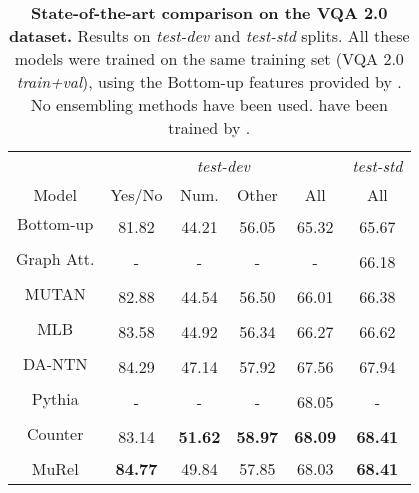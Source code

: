 \documentclass[10pt,twocolumn,letterpaper]{article}
\begin{document}
\begin{table}
    \centering
    \begin{tabular}{*5{c}c}
        \toprule
        & \multicolumn{4}{c}{\textit{test-dev}} & \textit{test-std}\\
        Model & Yes/No & Num. & Other & All & All  \\
        \midrule
        Bottom-up & \multirow{2}{*}{81.82} & \multirow{2}{*}{44.21} & \multirow{2}{*}{56.05} & \multirow{2}{*}{65.32} & \multirow{2}{*}{65.67} \\
        \cite{Anderson_2018_CVPR} \\
        Graph Att. & \multirow{2}{*}{-} & \multirow{2}{*}{-} & \multirow{2}{*}{-} & \multirow{2}{*}{-} & \multirow{2}{*}{66.18}\\
        \cite{learningconditionedgraph}\\
        MUTAN & \multirow{2}{*}{82.88} & \multirow{2}{*}{44.54} & \multirow{2}{*}{56.50} & \multirow{2}{*}{66.01} & \multirow{2}{*}{66.38}\\
         \cite{benyounescadene2017mutan}  \\
        MLB & \multirow{2}{*}{83.58} & \multirow{2}{*}{44.92} & \multirow{2}{*}{56.34} & \multirow{2}{*}{66.27} & \multirow{2}{*}{66.62}\\
        \cite{Kim2017} \\
        DA-NTN & \multirow{2}{*}{84.29} & \multirow{2}{*}{47.14} & \multirow{2}{*}{57.92} & \multirow{2}{*}{67.56} & \multirow{2}{*}{67.94}\\
        \cite{Bai_2018_ECCV} \\
        Pythia & \multirow{2}{*}{-} & \multirow{2}{*}{-} & \multirow{2}{*}{-} &  \multirow{2}{*}{68.05} & \multirow{2}{*}{-} \\
        \cite{pythia18arxiv}\\
        Counter & \multirow{2}{*}{83.14} & \multirow{2}{*}{\textbf{51.62}} & \multirow{2}{*}{\textbf{58.97}} & \multirow{2}{*}{\textbf{68.09}} & \multirow{2}{*}{\textbf{68.41}}\\
         \cite{zhang2018learning} \\
        \midrule
        MuRel & \textbf{84.77} & 49.84 & 57.85 & 68.03 & \textbf{68.41} \\ \bottomrule
    \end{tabular}
    \vspace{0.1cm}
    \caption{\label{tab:vqa2_sota} \textbf{State-of-the-art comparison on the VQA 2.0 dataset.} Results on \textit{test-dev} and \textit{test-std} splits. All these models were trained on the same training set (VQA 2.0 \textit{train+val}), using the Bottom-up features provided by \cite{Anderson_2018_CVPR}. No ensembling methods have been used.  have been trained by \cite{Bai_2018_ECCV}.}
\end{table}
\end{document}
